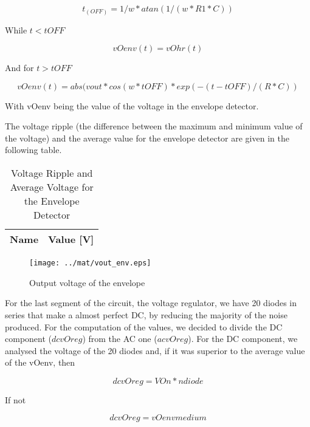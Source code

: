 \begin{equation}
t_(OFF) = 1/w * atan(1/(w*R1*C))
\label{eq:1.1}
\end{equation}

While $t<tOFF$

\begin{equation}
vOenv (t) = vOhr (t)
\label{eq:1.2}
\end{equation}

And for $t>tOFF$

\begin{equation}
vOenv (t) = abs(vout*cos(w*tOFF)*exp(-(t-tOFF)/(R*C))
\label{eq:1.3}
\end{equation}

With vOenv being the value of the voltage in the envelope detector.

The voltage ripple (the difference between the maximum and minimum value of the voltage) and the average value for the envelope detector are given in the following table.

\begin{table}[H]
  \centering
  \begin{tabular}{|l|r|}
    \hline    
    {\bf Name} & {\bf Value [V]} \\ \hline
    
  \end{tabular}
  \caption{Voltage Ripple and Average Voltage for the Envelope Detector}
  \label{tab:mat3}
\end{table}

\begin{figure}[H] \centering
\texttt{[image: ../mat/vout\_env.eps]}
\caption{Output voltage of the envelope}
\label{fig:mat4}
\end{figure}

For the last segment of the circuit, the voltage regulator, we have 20 diodes in series that make a almost perfect DC, by reducing the majority of the noise produced. For the computation of the values, we decided to divide the DC component ($dcvOreg$) from the AC one ($acvOreg$).
For the DC component, we analysed the voltage of the 20 diodes and, if it was superior to the average value of the vOenv, then

\begin{equation}
dcvOreg = VOn*ndiode
\label{eq:1.4}
\end{equation}

If not

\begin{equation}
dcvOreg = vOenvmedium
\label{eq:1.5}
\end{equation}

